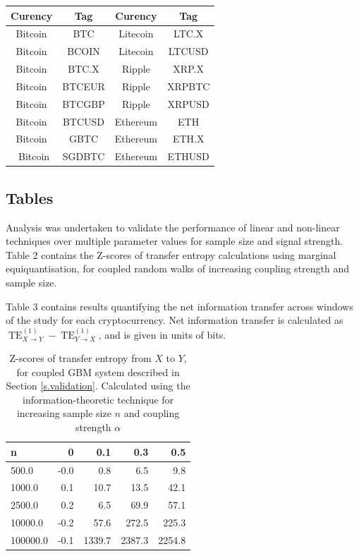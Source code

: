 \documentclass[]{rsos}%
\begin{document}
{\begin{table}[!htb]
      \begin{tabular}{cccc}
        Curency & Tag & Curency & Tag        \\ [0.5ex] 
        \hline 
        Bitcoin & BTC &  Litecoin & LTC.X    \\
        Bitcoin & BCOIN & Litecoin & LTCUSD  \\
        Bitcoin & BTC.X & Ripple & XRP.X     \\
        Bitcoin & BTCEUR & Ripple & XRPBTC   \\
        Bitcoin & BTCGBP & Ripple & XRPUSD   \\
        Bitcoin & BTCUSD & Ethereum & ETH    \\
        Bitcoin & GBTC & Ethereum & ETH.X    \\\
        Bitcoin & SGDBTC & Ethereum & ETHUSD \\
      \end{tabular}
    
    \end{table}

  
  \subsection{Tables} \label{a.tables}

  Analysis was undertaken to validate the performance of linear and non-linear techniques over multiple parameter values for sample size and signal strength. Table {\color{blue}2} contains the Z-scores of transfer entropy calculations using marginal equiquantisation, for coupled random walks of increasing coupling strength and sample size. 
  
  Table {\color{blue}3} contains results quantifying the net information transfer across windows of the study for each cryptocurrency. Net information transfer is calculated as $ \operatorname{TE}^{(1)}_{X \rightarrow Y} - \operatorname{TE}^{(1)}_{Y \rightarrow X} $, and is given in units of bits.

  
  \begin{table}[!htb]
    \label{t.table2}
    \caption{ Z-scores of transfer entropy from $X$ to $Y$, for coupled GBM system described in Section \ref{s.validation}. Calculated using the information-theoretic technique for increasing sample size $n$ and coupling strength $\alpha$}
    
      \begin{tabular}{lrrrr}

    n       &         0 &       0.1 &       0.3 &       0.5 \\
    \hline 
    500.0    & -0.0 &     0.8 &     6.5 &     9.8 \\
    1000.0   &  0.1 &    10.7 &    13.5 &    42.1 \\
    2500.0   &  0.2 &     6.5 &    69.9 &    57.1 \\
    10000.0  & -0.2 &    57.6 &   272.5 &   225.3 \\
    100000.0 & -0.1 &  1339.7 &  2387.3 &  2254.8 \\


\end{tabular}
\end{table}}
\end{document}
